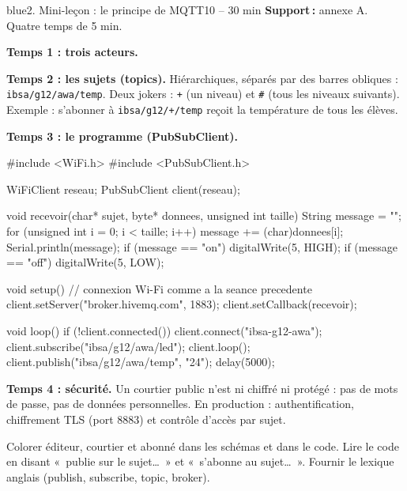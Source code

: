 \documentclass[11pt,a4paper]{article}
\begin{document}
\begin{etape}{blue}{2. Mini-leçon : le principe de MQTT}{10 -- 30 min}
\textbf{Support\,:} annexe A. Quatre temps de 5 min.

\textbf{Temps 1 : trois acteurs.}
\begin{center}
\end{center}

\textbf{Temps 2 : les sujets (topics).} Hiérarchiques, séparés par des barres obliques : \texttt{ibsa/g12/awa/temp}. Deux jokers : \texttt{+} (un niveau) et \texttt{\#} (tous les niveaux suivants). Exemple : s'abonner à \texttt{ibsa/g12/+/temp} reçoit la température de tous les élèves.

\textbf{Temps 3 : le programme (PubSubClient).}
\begin{arduino}
#include <WiFi.h>
#include <PubSubClient.h>

WiFiClient reseau;
PubSubClient client(reseau);

void recevoir(char* sujet, byte* donnees, unsigned int taille) {
  String message = "";
  for (unsigned int i = 0; i < taille; i++) {
    message += (char)donnees[i];
  }
  Serial.println(message);
  if (message == "on") digitalWrite(5, HIGH);
  if (message == "off") digitalWrite(5, LOW);
}

void setup() {
  // connexion Wi-Fi comme a la seance precedente
  client.setServer("broker.hivemq.com", 1883);
  client.setCallback(recevoir);
}

void loop() {
  if (!client.connected()) {
    client.connect("ibsa-g12-awa");
    client.subscribe("ibsa/g12/awa/led");
  }
  client.loop();
  client.publish("ibsa/g12/awa/temp", "24");
  delay(5000);
}
\end{arduino}

\textbf{Temps 4 : sécurité.} Un courtier public n'est ni chiffré ni protégé : pas de mots de passe, pas de données personnelles. En production : authentification, chiffrement TLS (port 8883) et contrôle d'accès par sujet.

\begin{astuce}
Colorer éditeur, courtier et abonné dans les schémas et dans le code. Lire le code en disant «~publie sur le sujet\ldots~» et «~s'abonne au sujet\ldots~». Fournir le lexique anglais (publish, subscribe, topic, broker).
\end{astuce}
\end{etape}
\end{document}
